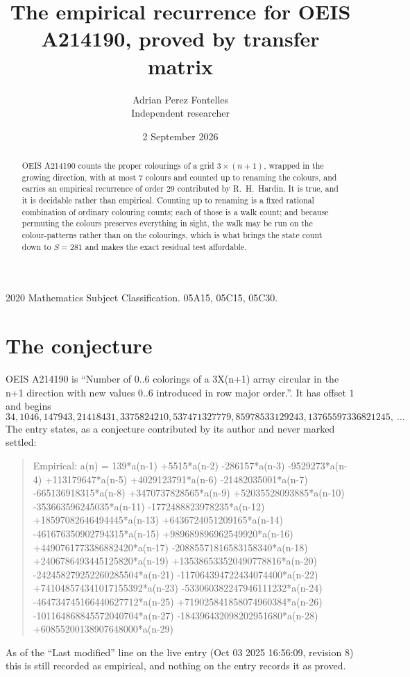 \documentclass[11pt,a4paper]{article}
\title{The empirical recurrence for OEIS A214190, proved by transfer matrix}
\author{Adrian Perez Fontelles\\ \small Independent researcher}
\date{2 September 2026}
\theoremstyle{plain}
\theoremstyle{definition}
\begin{document}
\maketitle

\begin{abstract}
OEIS A214190 counts the proper colourings of a grid $3\times(n+1)$, wrapped in the growing direction, with at most $7$ colours and
counted up to renaming the colours, and carries an empirical recurrence of order $29$
contributed by R.~H.~Hardin. It is true, and it is decidable rather than empirical. Counting
up to renaming is a fixed rational combination of ordinary colouring counts; each of those is
a walk count; and because permuting the colours preserves everything in sight, the walk may be
run on the colour-patterns rather than on the colourings, which is what brings the state count
down to $S=281$ and makes the exact residual test affordable.
\end{abstract}

\noindent\small 2020 Mathematics Subject Classification. 05A15, 05C15, 05C30.\normalsize

\section{The conjecture}

OEIS A214190 is ``Number of 0..6 colorings of a 3X(n+1) array circular in the n+1 direction with new values 0..6 introduced in row major order.''. It has offset $1$ and begins
\[
34, 1046, 147943, 21418431, 3375824210, 537471327779, 85978533129243, 13765597336821245,\ \dots
\]
The entry states, as a conjecture contributed by its author and never marked settled:
\begin{quote}
Empirical: a(n) = 139*a(n-1) +5515*a(n-2) -286157*a(n-3) -9529273*a(n-4) +113179647*a(n-5) +4029123791*a(n-6) -21482035001*a(n-7) -665136918315*a(n-8) +3470737828565*a(n-9) +52035528093885*a(n-10) -353663596245035*a(n-11) -1772488823978235*a(n-12) +18597082646494445*a(n-13) +6436724051209165*a(n-14) -461676350902794315*a(n-15) +989689896962549920*a(n-16) +4490761773386882420*a(n-17) -20885571816583158340*a(n-18) +2406786493445125820*a(n-19) +135386533520490778816*a(n-20) -242458279252260285504*a(n-21) -117064394722434074400*a(n-22) +741048574341017155392*a(n-23) -533060382247946111232*a(n-24) -464734745166440627712*a(n-25) +719025841858074960384*a(n-26) -101164868845572040704*a(n-27) -184396432098202951680*a(n-28) +60855200138907648000*a(n-29)
\end{quote}
As of the ``Last modified'' line on the live entry (Oct 03 2025 16:56:09, revision 8) this is still
recorded as empirical, and nothing on the entry records it as proved.
\end{document}
